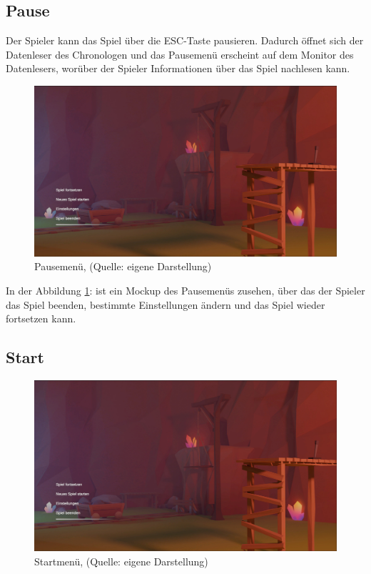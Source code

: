 \subsection{Pause}

Der Spieler kann das Spiel über die \ac{ESC}-Taste pausieren. Dadurch öffnet sich der Datenleser des Chronologen und das Pausemenü erscheint auf dem Monitor des Datenlesers, worüber der Spieler Informationen über das Spiel nachlesen kann.

\begin{figure}[ht]
\centering
\includegraphics[width=1\linewidth]{content/pictures/StartScreen.jpg}
\caption{Pausemenü, (Quelle: eigene Darstellung)}
\label{fig:pausemenu}
\end{figure}

In der Abbildung \ref{fig:pausemenu}:  ist ein Mockup des Pausemenüs zusehen, über das der Spieler das Spiel beenden, bestimmte Einstellungen ändern und das Spiel wieder fortsetzen kann.

\subsection{Start}

\begin{figure}[ht]
\centering
\includegraphics[width=1\linewidth]{content/pictures/StartScreen.jpg}
\caption{Startmenü, (Quelle: eigene Darstellung)}
\label{fig:mainmenu}
\end{figure}


